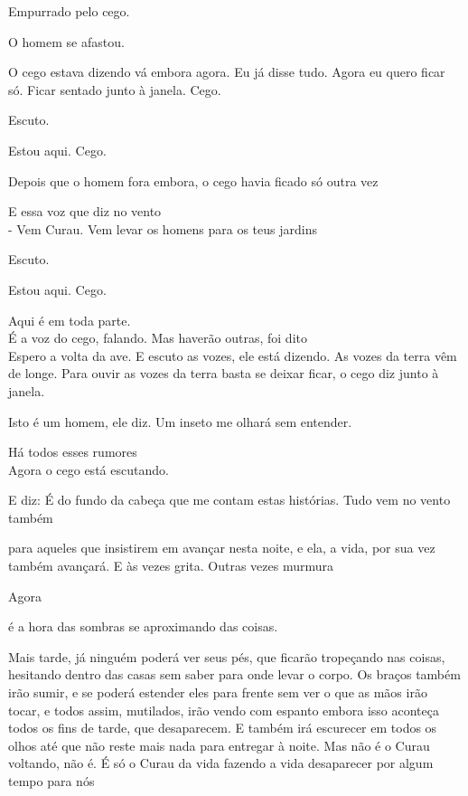 Empurrado pelo cego.

O homem se afastou.

O cego estava dizendo vá embora agora. Eu já disse tudo. Agora eu quero
ficar só. Ficar sentado junto à janela. Cego.

\pagebreak

Escuto.

Estou aqui. Cego.

\pagebreak

Depois que o homem fora embora, o cego havia ficado só outra vez

\pagebreak

E essa voz que diz no vento\\

- Vem Curau. Vem levar os homens para os teus jardins

\pagebreak

Escuto.

Estou aqui. Cego.

Aqui é em toda parte.\\

É a voz do cego, falando. Mas haverão outras, foi dito\\

Espero a volta da ave. E escuto as vozes, ele está dizendo. As vozes da
terra vêm de longe. Para ouvir as vozes da terra basta se deixar ficar,
o cego diz junto à janela.

Isto é um homem, ele diz. Um inseto me olhará sem entender.

Há todos esses rumores\\

Agora o cego está escutando.

E diz: É do fundo da cabeça que me contam estas histórias. Tudo vem no
vento também

para aqueles que insistirem em avançar nesta noite, e ela, a vida, por
sua vez também avançará. E às vezes grita. Outras vezes murmura

\pagebreak

Agora

é a hora das sombras se aproximando das coisas.

Mais tarde, já ninguém poderá ver seus pés, que ficarão tropeçando nas
coisas, hesitando dentro das casas sem saber para onde levar o corpo. Os
braços também irão sumir, e se poderá estender eles para frente sem ver
o que as mãos irão tocar, e todos assim, mutilados, irão vendo com
espanto embora isso aconteça todos os fins de tarde, que desaparecem. E
também irá escurecer em todos os olhos até que não reste mais nada para
entregar à noite. Mas não é o Curau voltando, não é. É só o Curau da
vida fazendo a vida desaparecer por algum tempo para nós

